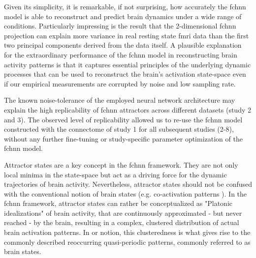\documentclass{article}
\begin{document}
Given its simplicity, it is remarkable, if not surprising, how accurately the \acrshort{fchnn} model is able to reconstruct and predict brain dynamics under a wide range of conditions. Particularly impressing is the result that the 2-dimensional \acrshort{fchnn} projection can explain more variance in real resting state \acrshort{fmri} data than the first two principal components derived from the data itself.
A plausible explanation for the extraordinary performance of the \acrshort{fchnn} model in reconstructing brain activity patterns is that it captures essential principles of the underlying dynamic processes that can be used to reconstruct the brain's activation state-space even if our empirical measurements are corrupted by noise and low sampling rate.

The known noise-tolerance of the employed neural network architecture may explain the high replicability of \acrshort{fchnn} attractors across different datasets (study 2 and 3). The observed level of replicability allowed us to re-use the \acrshort{fchnn} model constructed with the connectome of study 1 for all subsequent studies (2-8), without any further fine-tuning or study-specific parameter optimization of the \acrshort{fchnn} model.

Attractor states are a key concept in the \acrshort{fchnn} framework. They are not only local minima in the state-space but act as a driving force for the dynamic trajectories of brain activity. Nevertheless, attractor states should not be confused with the conventional notion of brain states (e.g. co-activation patterns \citep{chen2015introducing}). In the \acrshort{fchnn} framework, attractor states can rather be conceptualized as "Platonic idealizations" of brain activity, that are continuously approximated - but never reached - by the brain, resulting in a complex, clustered distribution of actual brain activation patterns. In or notion, this clusteredness is what gives rise to the commonly described reoccurring quasi-periodic patterns, commonly referred to as brain states.
\end{document}
